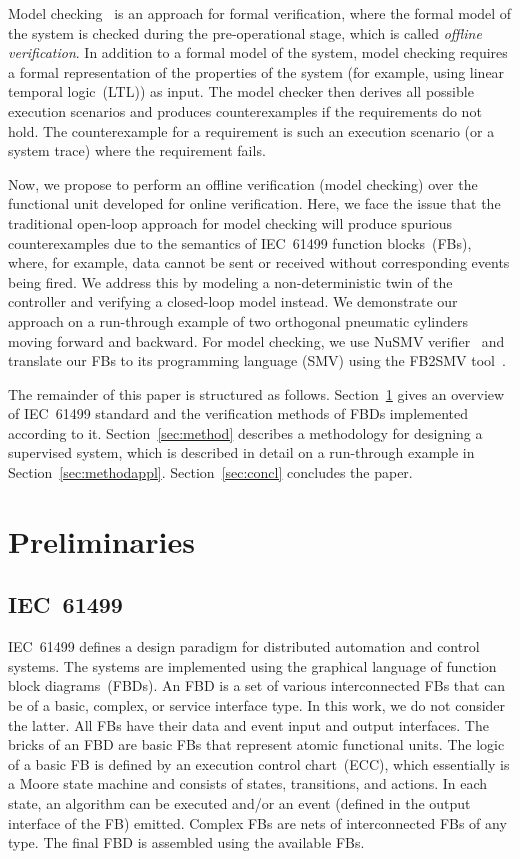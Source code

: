 \begin{bibunit}
Model checking~\cite{clarke1999} is an approach for formal verification, where the formal model of the system is checked during the pre-operational stage, which is called \emph{offline verification}. In addition to a formal model of the system, model checking requires a formal representation of the properties of the system (for example, using linear temporal logic~(LTL)) as input. The model checker then derives all possible execution scenarios and produces counterexamples if the requirements do not hold. The counterexample for a requirement is such an execution scenario (or a system trace) where the requirement fails. 

Now, we propose to perform an offline verification (model checking) over the functional unit developed for online verification. Here, we face the issue that the traditional open-loop approach for model checking will produce spurious counterexamples due to the semantics of IEC~61499 function blocks~(FBs), where, for example, data cannot be sent or received without corresponding events being fired. 
We address this by modeling a non-deterministic twin of the controller and verifying a closed-loop model instead. We demonstrate our approach on a run-through example of two orthogonal pneumatic cylinders moving forward and backward. For model checking, we use NuSMV verifier~\cite{nusmv} and translate our FBs to its programming language (SMV) using the FB2SMV tool~\cite{drozdov2015fb2smv}.

The remainder of this paper is structured as follows. Section~\ref{sec:prelim} gives an overview of IEC~61499 standard and the verification methods of FBDs implemented according to it. Section~\ref{sec:method} describes a methodology for designing a supervised system, which is described in detail on a run-through example in Section~\ref{sec:methodappl}. Section~\ref{sec:concl} concludes the paper.

\section{Preliminaries}
\label{sec:prelim}
\subsection{IEC~61499}
IEC~61499 defines a design paradigm for distributed automation and control systems. The systems are implemented using the graphical language of function block diagrams~(FBDs). An FBD is a set of various interconnected FBs that can be of a basic, complex, or service interface type. In this work, we do not consider the latter. All FBs have their data and event input and output interfaces. The bricks of an FBD are basic FBs that represent atomic functional units. The logic of a basic FB is defined by an execution control chart~(ECC), which essentially is a Moore state machine and consists of states, transitions, and actions. In each state, an algorithm can be executed and/or an event (defined in the output interface of the FB) emitted. Complex FBs are nets of interconnected FBs of any type. The final FBD is assembled using the available FBs.


\end{bibunit}
